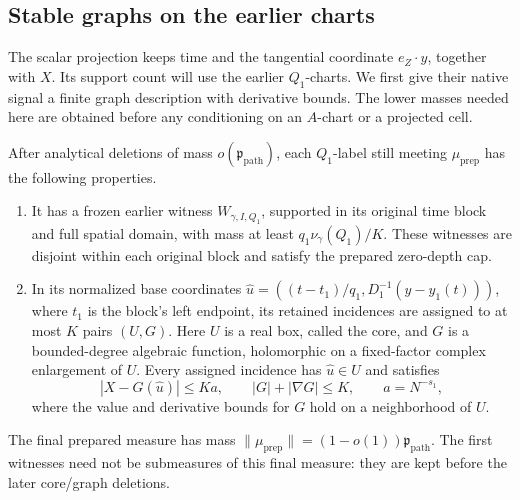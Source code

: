 \subsection{Stable graphs on the earlier charts}

The scalar projection keeps time and the tangential coordinate
\(e_Z\cdot y\), together with \(X\). Its support count will use
the earlier \(Q_1\)-charts. We first give their native signal a finite
graph description with derivative bounds.  The lower masses needed here
are obtained before any conditioning on an \(A\)-chart or a projected
cell.

\begin{lemma}
\label{a08:earlier-graphs}
After analytical deletions of mass \(o(\mathfrak p_{\mathrm{path}})\),
each \(Q_1\)-label still meeting \(\mu_{\mathrm{prep}}\) has the
following properties.
\begin{enumerate}
\item It has a frozen earlier witness \(W_{\gamma,I,Q_1}\), supported
in its original time block and full spatial domain, with mass at least
\(q_1\nu_\gamma(Q_1)/K\).  These witnesses are disjoint within each
original block and satisfy the prepared zero-depth cap.
\item In its normalized base coordinates
\(\widehat u=((t-t_1)/q_1,D_1^{-1}(y-y_1(t)))\), where \(t_1\)
is the block's left endpoint, its retained incidences are assigned
to at most \(K\) pairs \((U,G)\).  Here \(U\) is a real box, called
the core, and \(G\) is a bounded-degree algebraic function,
holomorphic on a fixed-factor complex enlargement of \(U\).
Every assigned incidence has \(\widehat u\in U\) and satisfies
\[
 |X-G(\widehat u)|\le Ka,\qquad
 |G|+|\nabla G|\le K,
 \qquad a=N^{-s_1},
\]
where the value and derivative bounds for \(G\) hold on a
neighborhood of \(U\).
\end{enumerate}
The final prepared measure has mass
\(\|\mu_{\mathrm{prep}}\|=(1-o(1))\mathfrak p_{\mathrm{path}}\).
The first witnesses need not be submeasures of this final measure:
they are kept before the later core/graph deletions.
\end{lemma}

